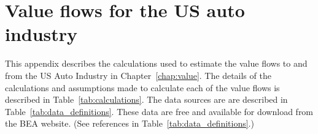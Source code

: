 %
%
%
\chapter{Value flows for the US auto industry}
\label{chap:auto_value_flows} 


This appendix describes the calculations used 
to estimate the value flows to and from the US Auto Industry  
in Chapter~\ref{chap:value}.  
The details of the calculations and assumptions made to calculate 
each of the value flows is described in Table~\ref{tab:calculations}. 
The data sources are are described in Table~\ref{tab:data_definitions}. 
These data are free and available for download 
from the BEA website.
(See references in Table~\ref{tab:data_definitions}.)


